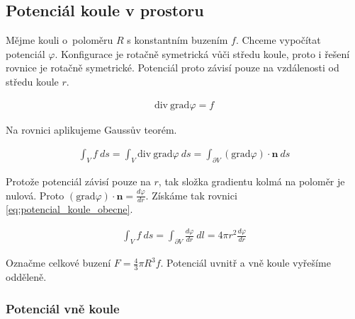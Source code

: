 \documentclass{book}
\newcommand{\vect}[1]{\boldsymbol{#1}}
\newcommand{\grad}{\mathrm{grad}}
\newcommand{\diverg}{\mathrm{div}}
\begin{document}
\subsection{Potenciál koule v prostoru}

Mějme kouli o~poloměru \(R\) s konstantním buzením \(f\). Chceme vypočítat potenciál \(\varphi\). Konfigurace je rotačně symetrická vůči středu
koule, proto i řešení rovnice je rotačně symetrické. Potenciál proto závisí pouze na vzdálenosti od středu koule \(r\).




\begin{equation}
\begin{split}
\diverg \ \grad \varphi = f
\end{split}
\end{equation}

Na rovnici aplikujeme Gaussův teorém.

\begin{equation}
\begin{split}
\int_V f \ ds = \int_V \diverg \ \grad \varphi \ ds = \int_{\partial V} (\grad \varphi) \cdot \vect{n} \ ds
\end{split}
\end{equation}

Protože potenciál závisí pouze na \(r\), tak složka gradientu kolmá na poloměr je nulová. Proto \((\grad \varphi) \cdot \vect{n} = \frac{d \varphi}{dr}\).
Získáme tak rovnici \eqref{eq:potencial_koule_obecne}.

\begin{equation}
\label{eq:potencial_koule_obecne}
\begin{split}
\int_V f \ ds = \int_{\partial V} \frac{d \varphi}{dr} \ dl = 4 \pi r^2 \frac{d \varphi}{dr}
\end{split}
\end{equation}

Označme celkové buzení \(F = \frac{4}{3} \pi R^3 f\).
Potenciál uvnitř a vně koule vyřešíme odděleně.

\subsubsection{Potenciál vně koule}
\end{document}
